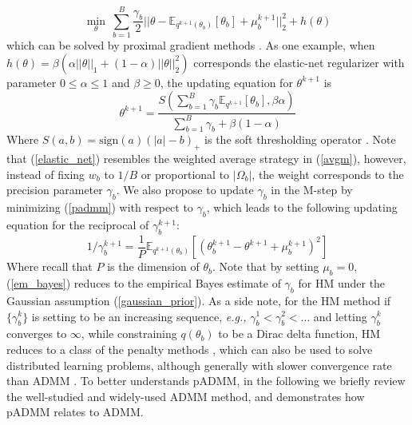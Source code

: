 \documentclass{article}
\newcommand{\eg}[0]{\emph{e.g., }}
\newcommand{\1}[0]{\ensuremath{\boldsymbol{1}}\xspace}
\begin{document}
\begin{equation}\label{padmm_m_step}
\min_{\theta} ~\textstyle\sum_{b=1}^B\frac{\gamma_b}{2}||\theta-\mathbb{E}_{q^{k+1}(\theta_b)}[\theta_b] + \mu^{k+1}_b||^2_2 + h(\theta)
\end{equation}
which can be solved by proximal gradient methods \cite{Parikh13}. As one example, when $h(\theta) = \beta(\alpha||\theta||_1 + (1-\alpha)||\theta||^2_2)$ corresponds the elastic-net regularizer with parameter $0\le\alpha\le 1$ and $\beta\ge0$, the updating equation for $\theta^{k+1}$ is
\begin{equation}\label{elastic_net}
\theta^{k+1} = \frac{S\left(\textstyle\sum_{b=1}^B\gamma_b\mathbb{E}_{q^{k+1}}[\theta_b], \beta\alpha \right)}{\textstyle\sum_{b=1}^B\gamma_b + \beta(1-\alpha)}
\end{equation}
Where $S(a, b) = \mbox{sign}(a)(|a|-b)_{+}$ is the soft thresholding operator \cite{Friedman2010}. Note that (\ref{elastic_net}) resembles the weighted average strategy in (\ref{avgm}), however, instead of fixing $w_b$ to $1/B$ or proportional to $|\Omega_b|$, the weight corresponds to the precision parameter $\gamma_b$. We also propose to update $\gamma_b$ in the M-step by minimizing (\ref{padmm}) with respect to $\gamma_b$, which leads to the following updating equation for the reciprocal of $\gamma_b^{k+1}$:
\begin{equation}\label{em_bayes}
1/\gamma_b^{k+1} = \frac{1}{P}\mathbb{E}_{q^{k+1}(\theta_b)}[(\theta_b^{k+1}-\theta^{k+1}+\mu_b^{k+1})^2]
\end{equation}
Where recall that $P$ is the dimension of $\theta_b$. Note that by setting $\mu_b = 0$, (\ref{em_bayes}) reduces to the empirical Bayes estimate of $\gamma_b$ for HM under the Gaussian assumption (\ref{gaussian_prior}). As a side note, for the HM method if $\{\gamma_b^k\}$ is setting to be an increasing sequence, \eg $\gamma_b^{1} < \gamma_b^{2} < \ldots$ and letting $\gamma_b^{k}$ converges to $\infty$, while constraining $q(\theta_b)$ to be a Dirac delta function, HM reduces to a class of the penalty methods \cite{Bertsekas1989, Bertsekas1996}, which can also be used to solve distributed learning problems, although generally with slower convergence rate than ADMM \cite{Bertsekas1989}. To better understands pADMM, in the following we briefly review the well-studied and widely-used ADMM method, and demonstrates how pADMM relates to ADMM.

\end{document}
